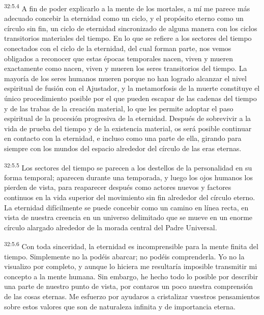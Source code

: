\par
\textsuperscript{32:5.4} A fin de poder explicarlo a la mente de los mortales, a mí me parece más adecuado concebir la eternidad como un ciclo, y el propósito eterno como un círculo sin fin, un ciclo de eternidad sincronizado de alguna manera con los ciclos transitorios materiales del tiempo. En lo que se refiere a los sectores del tiempo conectados con el ciclo de la eternidad, del cual forman parte, nos vemos obligados a reconocer que estas épocas temporales nacen, viven y mueren exactamente como nacen, viven y mueren los seres transitorios del tiempo. La mayoría de los seres humanos mueren porque no han logrado alcanzar el nivel espiritual de fusión con el Ajustador, y la metamorfosis de la muerte constituye el único procedimiento posible por el que pueden escapar de las cadenas del tiempo y de las trabas de la creación material, lo que les permite adoptar el paso espiritual de la procesión progresiva de la eternidad. Después de sobrevivir a la vida de prueba del tiempo y de la existencia material, os será posible continuar en contacto con la eternidad, e incluso como una parte de ella, girando para siempre con los mundos del espacio alrededor del círculo de las eras eternas.

\par
\textsuperscript{32:5.5} Los sectores del tiempo se parecen a los destellos de la personalidad en su forma temporal; aparecen durante una temporada, y luego los ojos humanos los pierden de vista, para reaparecer después como actores nuevos y factores continuos en la vida superior del movimiento sin fin alrededor del círculo eterno. La eternidad difícilmente se puede concebir como un camino en línea recta, en vista de nuestra creencia en un universo delimitado que se mueve en un enorme círculo alargado alrededor de la morada central del Padre Universal.

\par
\textsuperscript{32:5.6} Con toda sinceridad, la eternidad es incomprensible para la mente finita del tiempo. Simplemente no la podéis abarcar; no podéis comprenderla. Yo no la visualizo por completo, y aunque lo hiciera me resultaría imposible transmitir mi concepto a la mente humana. Sin embargo, he hecho todo lo posible por describir una parte de nuestro punto de vista, por contaros un poco nuestra comprensión de las cosas eternas. Me esfuerzo por ayudaros a cristalizar vuestros pensamientos sobre estos valores que son de naturaleza infinita y de importancia eterna.

